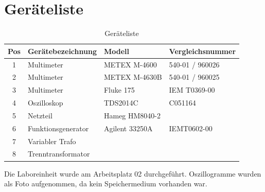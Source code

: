 \section{Geräteliste}\label{sec:geraeteliste}

\begin{table}[h]
    \centering
    \caption{Geräteliste}\label{tab:geraeteliste}
    \begin{tabularx}{\columnwidth}{cXXX}
        Pos & \textbf{Gerätebezeichnung} & \textbf{Modell} & \textbf{Vergleichsnummer}\\ \midrule
        1 & Multimeter & METEX M-4600 & 540-01 / 960026\\
        2 & Multimeter & METEX M-4630B & 540-01 / 960025\\
        3 & Multimeter & Fluke 175 & IEM T0369-00\\
        4 & Oszilloskop & TDS2014C & C051164\\
        5 & Netzteil & Hameg HM8040-2 & \\
        6 & Funktionsgenerator & Agilent 33250A & IEMT0602-00\\
        7 & Variabler Trafo & & \\
        8 & Trenntransformator & & \\
\end{tabularx}
\end{table}

Die Laboreinheit wurde am Arbeitsplatz 02 durchgeführt. Oszillogramme wurden
als Foto aufgenommen, da kein Speichermedium vorhanden war.